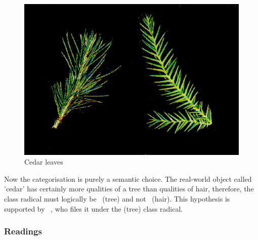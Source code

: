 \begin{figure}[htbp]
\begin{center}
\includegraphics[scale=0.4]{images/radicalStructure/cedar.png}
\caption{Cedar leaves}
\label{fig:cedarleaves}
\end{center}
\end{figure}
Now the categorisation is purely a semantic choice. The real-world object
called 'cedar' has certainly more
qualities of a tree than qualities of hair, therefore, the class radical must
logically be~ (tree) and not~ (hair).
This hypothesis is supported by
~\citeyear{Hadamitzky1995}, 
who files it under the  (tree) class radical. %

\subsubsection{Readings}
\label{sec:readings}

